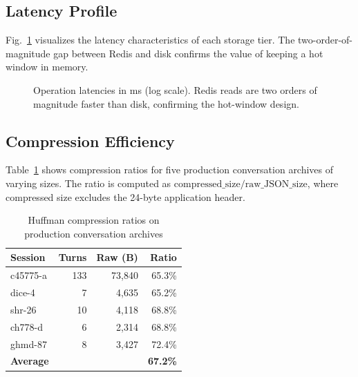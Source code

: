 \documentclass[conference]{IEEEtran}
\begin{document}
\subsection{Latency Profile}

Fig.~\ref{fig:latency} visualizes the latency characteristics of each storage tier. The two-order-of-magnitude gap between Redis and disk confirms the value of keeping a hot window in memory.

\begin{figure}[h]
\centering
{}
\caption{Operation latencies in ms (log scale). Redis reads are two orders of magnitude faster than disk, confirming the hot-window design.}
\label{fig:latency}
\end{figure}

\subsection{Compression Efficiency}

Table~\ref{tab:compression} shows compression ratios for five production conversation archives of varying sizes. The ratio is computed as $\text{compressed\_size} / \text{raw\_JSON\_size}$, where compressed size excludes the 24-byte application header.

\begin{table}[h]
\centering
\caption{Huffman compression ratios on production conversation archives}
\label{tab:compression}
\begin{tabular}{lrrr}
\toprule
\textbf{Session} & \textbf{Turns} & \textbf{Raw (B)} & \textbf{Ratio} \\
\midrule
c45775-a & 133 & 73{,}840 & 65.3\% \\
dice-4 & 7 & 4{,}635 & 65.2\% \\
shr-26 & 10 & 4{,}118 & 68.8\% \\
ch778-d & 6 & 2{,}314 & 68.8\% \\
ghmd-87 & 8 & 3{,}427 & 72.4\% \\
\midrule
\textbf{Average} & & & \textbf{67.2\%} \\
\bottomrule
\end{tabular}
\end{table}
\end{document}
